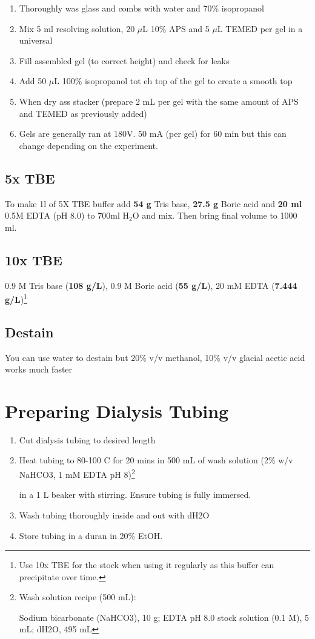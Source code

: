 \documentclass{tufte-book} %
\begin{document}
\begin{enumerate}
\item Thoroughly was glass and combs with water and 70\% isopropanol
\item Mix 5 ml resolving solution, 20 $\mu$L 10\% APS and 5 $\mu$L TEMED per gel in a universal
\item Fill assembled gel (to correct height) and check for leaks
\item Add 50 $\mu$L 100\% isopropanol tot eh top of the gel to create a smooth top
\item When dry ass stacker (prepare 2 mL per gel with the same amount of APS and TEMED as previously added)
\item Gels are generally ran at 180V. 50 mA (per gel) for 60 min but this can change depending on the experiment.
\end{enumerate}

\subsection{5x TBE}

To make 1l of 5X TBE buffer add \textbf{54 g} Tris base, \textbf{27.5 g} Boric acid and \textbf{20 ml} 0.5M EDTA (pH 8.0) to 700ml H$_{2}$O and mix. Then bring final volume to 1000 ml.

\subsection{10x TBE}

0.9 M Tris base (\textbf{108 g/L}), 0.9 M Boric acid (\textbf{55 g/L}), 20 mM EDTA (\textbf{7.444 g/L})\footnote{Use 10x TBE for the stock when using it regularly as this buffer can precipitate over time.}

\subsection{Destain}
You can use water to destain but 20\% v/v methanol, 10\% v/v glacial acetic acid works much faster

\section{Preparing Dialysis Tubing}


\begin{enumerate}
\item Cut dialysis tubing to desired length 
\item Heat tubing to 80-100 C for 20 mins in 500 mL of wash solution (2\% w/v NaHCO3, 1 mM EDTA pH 8)\footnote{

Wash solution recipe (500 mL): 

Sodium bicarbonate (NaHCO3), 10 g; 
EDTA pH 8.0 stock solution (0.1 M), 5 mL;
dH2O, 495 mL}

 in a 1 L beaker with stirring. Ensure tubing is fully immersed.
\item Wash tubing thoroughly inside and out with dH2O
\item Store tubing in a duran in 20\% EtOH.
\end{enumerate}
\end{document}
